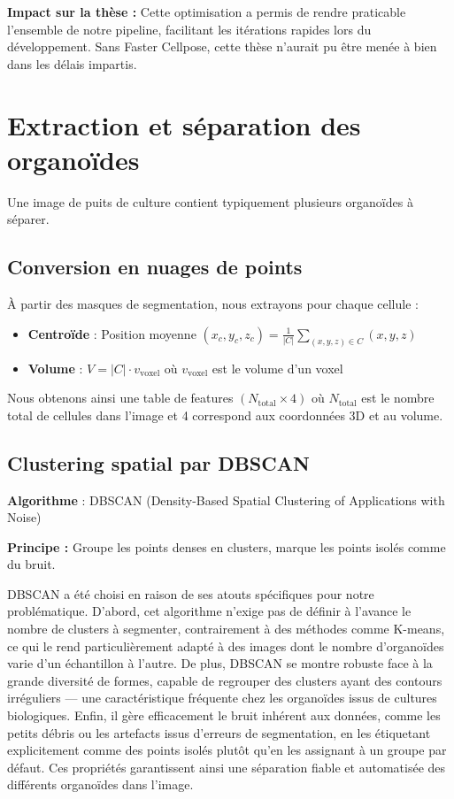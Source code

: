 \textbf{Impact sur la thèse :}
Cette optimisation a permis de rendre praticable l'ensemble de notre pipeline, facilitant les itérations rapides lors du développement. Sans Faster Cellpose, cette thèse n'aurait pu être menée à bien dans les délais impartis.

\section{Extraction et séparation des organoïdes}

Une image de puits de culture contient typiquement plusieurs organoïdes à séparer.

\subsection{Conversion en nuages de points}

À partir des masques de segmentation, nous extrayons pour chaque cellule :
\begin{itemize}
    \item \textbf{Centroïde} : Position moyenne $(x_c, y_c, z_c) = \frac{1}{|C|}\sum_{(x,y,z) \in C} (x,y,z)$
    \item \textbf{Volume} : $V = |C| \cdot v_{\text{voxel}}$ où $v_{\text{voxel}}$ est le volume d'un voxel
\end{itemize}

Nous obtenons ainsi une table de features $(N_{\text{total}} \times 4)$ où $N_{\text{total}}$ est le nombre total de cellules dans l'image et 4 correspond aux coordonnées 3D et au volume.

\subsection{Clustering spatial par DBSCAN}

\textbf{Algorithme} : DBSCAN (Density-Based Spatial Clustering of Applications with Noise)

\textbf{Principe :}
Groupe les points denses en clusters, marque les points isolés comme du bruit.

DBSCAN a été choisi en raison de ses atouts spécifiques pour notre problématique. D'abord, cet algorithme n'exige pas de définir à l'avance le nombre de clusters à segmenter, contrairement à des méthodes comme K-means, ce qui le rend particulièrement adapté à des images dont le nombre d'organoïdes varie d'un échantillon à l'autre. De plus, DBSCAN se montre robuste face à la grande diversité de formes, capable de regrouper des clusters ayant des contours irréguliers — une caractéristique fréquente chez les organoïdes issus de cultures biologiques. Enfin, il gère efficacement le bruit inhérent aux données, comme les petits débris ou les artefacts issus d'erreurs de segmentation, en les étiquetant explicitement comme des points isolés plutôt qu’en les assignant à un groupe par défaut. Ces propriétés garantissent ainsi une séparation fiable et automatisée des différents organoïdes dans l'image.


